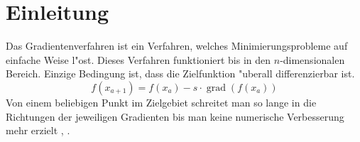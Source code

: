 \section{Einleitung}
Das Gradientenverfahren ist ein Verfahren, welches Minimierungsprobleme
auf einfache Weise l"ost. Dieses Verfahren funktioniert bis in den
$n$-dimensionalen Bereich. Einzige Bedingung ist, dass die Zielfunktion
"uberall differenzierbar ist.
\begin{equation}
f(x_{a+1})=f(x_a) - s \cdot \operatorname{grad}(f(x_a))
\end{equation}
Von einem beliebigen Punkt im Zielgebiet schreitet man so lange in die
Richtungen der jeweiligen Gradienten bis man keine numerische Verbesserung
mehr erzielt \cite{descent:wiki}, \cite{descent:geigerkanzow}.

